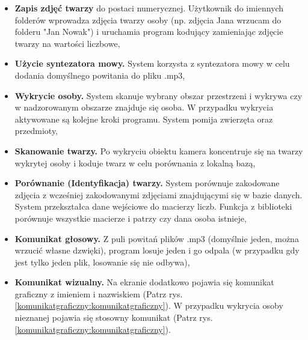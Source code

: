 \documentclass[a4paper,12pt,reqno]{article}
\begin{document}
\begin{itemize}
	\item \textbf{Zapis zdjęć twarzy} do postaci numerycznej. Użytkownik do imiennych folderów wprowadza zdjęcia twarzy osoby (np. zdjęcia Jana wrzucam do folderu "Jan Nowak") i uruchamia program kodujący zamieniając zdjęcie twarzy na wartości liczbowe,
	\item \textbf{Użycie syntezatora mowy.} System korzysta z syntezatora mowy w celu dodania domyślnego powitania do pliku .mp3,
	\item \textbf{Wykrycie osoby.} System skanuje wybrany obszar przestrzeni i wykrywa czy w nadzorowanym obszarze znajduje się osoba. W przypadku wykrycia aktywowane są kolejne kroki programu. System pomija zwierzęta oraz przedmioty,
	\item \textbf{Skanowanie  twarzy.} Po wykryciu obiektu kamera koncentruje się na twarzy wykrytej osoby i koduje twarz w celu porównania z lokalną bazą,
	\item \textbf{Porównanie (Identyfikacja) twarzy.} System porównuje zakodowane zdjęcia z wcześniej zakodowanymi zdjęciami znajdującymi się w bazie danych. System przekształca dane wejściowe do macierzy liczb. Funkcja z biblioteki porównuje wszystkie macierze i patrzy czy dana osoba istnieje,
	\item \textbf{Komunikat głosowy.} Z puli powitań plików .mp3 (domyślnie jeden, można wrzucić własne dzwięki), program losuje jeden i go odpala (w przypadku gdy jest tylko jeden plik, losowanie się nie odbywa),
	\item \textbf{Komunikat wizualny.} Na ekranie dodatkowo pojawia się komunikat graficzny z imieniem i nazwiskiem (Patrz rys. \ref{komunikatgraficzny:komunikatgraficzny}). W przypadku wykrycia osoby nieznanej pojawia się stosowny komunikat (Patrz rys. \ref{komunikatgraficzny:komunikatgraficzny}).
\end{itemize}
\end{document}
